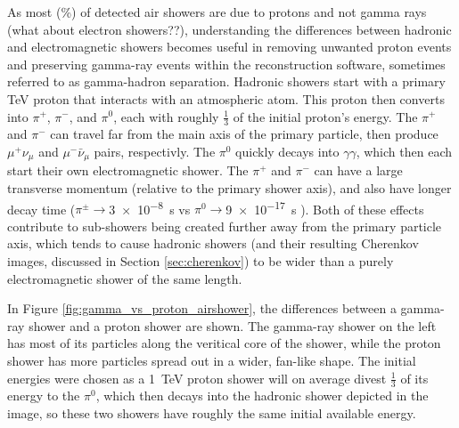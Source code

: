   As most (\%) of detected air showers are due to {\color{red}protons and not gamma rays (what about electron showers??)}, understanding the differences between hadronic and electromagnetic showers becomes useful in removing unwanted proton events and preserving gamma-ray events within the reconstruction software, sometimes referred to as gamma-hadron separation.
  Hadronic showers start with a primary \nicetilde TeV proton that interacts with an atmospheric atom.
  This proton then converts into $\pi^{+}$, $\pi^{-}$, and $\pi^{0}$, each with roughly \nicetilde $\frac{1}{3}$ of the initial proton's energy.
  The $\pi^{+}$ and $\pi^{-}$ can travel far from the main axis of the primary particle, then produce $\mu^{+}\nu_{\mu}$ and $\mu^{-}\bar{\nu}_{\mu}$ pairs, respectivly.
  The $\pi^{0}$ quickly decays into $\gamma\gamma$, which then each start their own electromagnetic shower.
  The $\pi^{+}$ and $\pi^{-}$ can have a large transverse momentum (relative to the primary shower axis), and also have longer decay time ($\pi^{\pm} \rightarrow $\SI{3e-8}{s} vs $\pi^{0} \rightarrow $\SI{9e-17}{s} \cite{pdg_2014} ).
  Both of these effects contribute to sub-showers being created further away from the primary particle axis, which tends to cause hadronic showers (and their resulting Cherenkov images, discussed in Section \ref{sec:cherenkov}) to be wider than a purely electromagnetic shower of the same length. 
  
  In Figure \ref{fig:gamma_vs_proton_airshower}, the differences between a gamma-ray shower and a proton shower are shown.
  The gamma-ray shower on the left has most of its particles along the veritical core of the shower, while the proton shower has more particles spread out in a wider, fan-like shape.
  The initial energies were chosen as a \SI{1}{TeV} proton shower will on average divest $\frac{1}{3}$ of its energy to the $\pi^{0}$, which then decays into the hadronic shower depicted in the image, so these two showers have roughly the same initial available energy.

